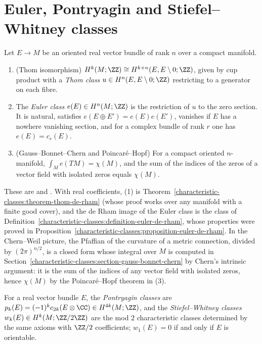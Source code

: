 \section{Euler, Pontryagin and Stiefel--Whitney classes}\label{characteristic-classes:section-euler}

\begin{theorem}\label{characteristic-classes:theorem-euler}
Let $E \to M$ be an oriented real vector bundle of rank $n$ over a compact manifold.
\begin{enumerate}
\item (Thom isomorphism) $H^{k}(M; \ZZ) \cong H^{k+n}(E, E \setminus 0; \ZZ)$, given by cup product with a \emph{Thom class} $u \in H^n(E, E \setminus 0; \ZZ)$ restricting to a generator on each fibre.
\item The \emph{Euler class} $e(E) \in H^n(M; \ZZ)$ is the restriction of $u$ to the zero section. It is natural, satisfies $e(E \oplus E') = e(E)e(E')$, vanishes if $E$ has a nowhere vanishing section, and for
a complex bundle of rank $r$ one has $e(E) = c_r(E)$.
\item (Gauss--Bonnet--Chern and Poincar\'e--Hopf) For a compact oriented $n$-manifold, $\int_Me(TM) = \chi(M)$, and the sum of the indices of the zeros of a vector field with isolated zeros equals $\chi(M)$.
\end{enumerate}
\end{theorem}

These are \cite[Chapters 9--11]{milnor-stasheff} and \cite[Chapter 6]{bott-tu}. With real coefficients, (1) is Theorem~\ref{characteristic-classes:theorem-thom-de-rham} (whose proof works over
any manifold with a finite good cover), and the de Rham image of the Euler class is the class of Definition~\ref{characteristic-classes:definition-euler-de-rham}, whose
properties were proved in Proposition~\ref{characteristic-classes:proposition-euler-de-rham}. In the Chern--Weil picture, the Pfaffian of the curvature of a metric connection, divided by
$(2\pi)^{n/2}$, is a closed form whose integral over $M$ is computed in Section~\ref{characteristic-classes:section-gauss-bonnet-chern} by Chern's intrinsic argument: it is the sum of the
indices of any vector field with isolated zeros, hence $\chi(M)$ by the Poincar\'e--Hopf theorem in (3).

\begin{definition}\label{characteristic-classes:definition-pontryagin}
For a real vector bundle $E$, the \emph{Pontryagin classes} are $p_k(E) = (-1)^kc_{2k}(E \otimes \CC) \in H^{4k}(M; \ZZ)$, and the \emph{Stiefel--Whitney classes} $w_k(E) \in H^k(M; \ZZ/2\ZZ)$ are the mod $2$
characteristic classes determined by the same axioms with $\ZZ/2$ coefficients; $w_1(E) = 0$ if and only if $E$ is orientable.
\end{definition}

